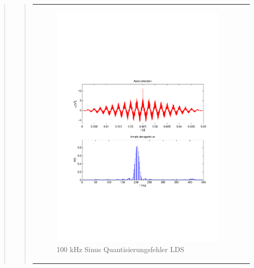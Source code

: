 \begin{quote}
\begin{quote}
\begin{center}
\begin{tabular}{ll}
                \begin{minipage}{0.6\textwidth}
                    \begin{figure}[H]
                        \includegraphics[scale=0.55, trim = 16mm 70mm 16mm 85mm, clip]{Bilder/100kHz_sin_LSD}
                       \caption{100 kHz Sinus Quantisierungsfehler LDS}
		              \label{fig:100kHz_sin_LDS}
                    \end{figure}
                \end{minipage}
            
            \end{tabular}
        \end{center}
            
        \vspace{2em}
    	
    	\end{quote}
    
\end{quote}



